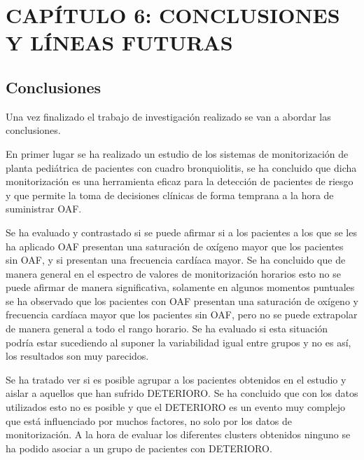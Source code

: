 \section{CAPÍTULO 6: CONCLUSIONES Y LÍNEAS FUTURAS}\label{cap:conclusionesANDlineasfuturas}

\subsection{Conclusiones}\label{sec:conclusiones}

Una vez finalizado el trabajo de investigación realizado se van a abordar las conclusiones. 

En primer lugar se ha realizado un estudio de los sistemas de monitorización de planta pediátrica de pacientes con cuadro bronquiolitis, se ha concluido que dicha monitorización es una herramienta eficaz para la detección de pacientes de riesgo y que permite la toma de decisiones clínicas de forma temprana a la hora de suministrar OAF.

Se ha evaluado y contrastado si se puede afirmar si a los pacientes a los que se les ha aplicado OAF presentan una saturación de oxígeno mayor que los pacientes sin OAF, y si presentan una frecuencia cardíaca mayor. Se ha concluido que de manera general en el espectro de valores de monitorización horarios esto no se puede afirmar de manera significativa, solamente en algunos momentos puntuales se ha observado que los pacientes con OAF presentan una saturación de oxígeno y frecuencia cardíaca mayor que los pacientes sin OAF, pero no se puede extrapolar de manera general a todo el rango horario. Se ha evaluado si esta situación podría estar sucediendo al suponer la variabilidad igual entre grupos y no es así, los resultados son muy parecidos. 

Se ha tratado ver si es posible agrupar a los pacientes obtenidos en el estudio y aislar a aquellos que han sufrido DETERIORO. Se ha concluido que con los datos utilizados esto no es posible y que el DETERIORO es un evento muy complejo que está influenciado por muchos factores, no solo por los datos de monitorización. A la hora de evaluar los diferentes clusters obtenidos ninguno se ha podido asociar a un grupo de pacientes con DETERIORO.

